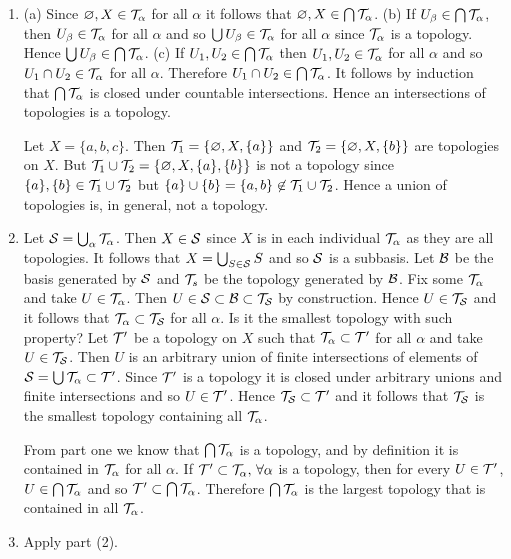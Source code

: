 \begin{sol}
    ${}$
    \begin{enumerate}
        \item (a) Since $\varnothing, X\in\mathcal{T}_\alpha$ for all $\alpha$ it follows that $\varnothing, X\in\bigcap\mathcal{T}_\alpha$. (b) If $U_\beta\in\bigcap\mathcal{T}_\alpha$, then $U_\beta\in\mathcal{T}_\alpha$ for all $\alpha$ and so $\bigcup U_\beta\in\mathcal{T}_\alpha$ for all $\alpha$ since $\mathcal{T}_\alpha$ is a topology. Hence $\bigcup U_\beta\in\bigcap\mathcal{T}_\alpha$. 
        (c) If $U_1,U_2\in\bigcap\mathcal{T}_\alpha$ then $U_1,U_2\in\mathcal{T}_\alpha$ for all $\alpha$ and so $U_1\cap U_2\in\mathcal{T}_\alpha$ for all $\alpha$. Therefore $U_1\cap U_2\in\bigcap \mathcal{T}_\alpha$. It follows by induction that $\bigcap\mathcal{T}_\alpha$ is closed under countable intersections. Hence an intersections of topologies is a topology.
        
        Let $X=\{a,b,c\}$. Then $\mathcal{T}_1=\{\varnothing, X, \{a\}\}$ and $\mathcal{T}_2=\{\varnothing, X, \{b\}\}$ are topologies on $X$. But $\mathcal{T}_1\cup\mathcal{T}_2=\{\varnothing, X, \{a\}, \{b\}\}$ is not a topology since $\{a\},\{b\}\in\mathcal{T}_1\cup\mathcal{T}_2$ but $\{a\}\cup\{b\}=\{a,b\}\not\in\mathcal{T}_1\cup\mathcal{T}_2$. Hence a union of topologies is, in general, not a topology. 
        
        \item Let $\mathcal{S}=\bigcup_\alpha \mathcal{T}_\alpha$. Then $X\in\mathcal{S}$ since $X$ is in each individual $\mathcal{T}_\alpha$ as they are all topologies. It follows that $X=\bigcup_{S\in\mathcal{S}} S$ and so $\mathcal{S}$ is a subbasis. 
        Let $\mathcal{B}$ be the basis generated by $\mathcal{S}$ and $\mathcal{T}_s$ be the topology generated by $\mathcal{B}$. Fix some $\mathcal{T}_\alpha$ and take $U\in\mathcal{T}_\alpha$. Then $U\in\mathcal{S}\subset\mathcal{B}\subset\mathcal{T}_{\mathcal{S}}$ by construction.
        Hence $U\in\mathcal{T}_{\mathcal{S}}$ and it follows that $\mathcal{T}_\alpha\subset\mathcal{T}_{\mathcal{S}}$ for all $\alpha$. Is it the smallest topology with such property? Let $\mathcal{T}'$ be a topology on $X$ such that $\mathcal{T}_\alpha\subset\mathcal{T}'$ for all $\alpha$ and take $U\in\mathcal{T}_{\mathcal{S}}$.
        Then $U$ is an arbitrary union of finite intersections of elements of $\mathcal{S}=\bigcup\mathcal{T}_\alpha\subset\mathcal{T}'$. Since $\mathcal{T}'$ is a topology it is closed under arbitrary unions and finite intersections and so $U\in\mathcal{T}'$. Hence $\mathcal{T}_{\mathcal{S}}\subset\mathcal{T}'$ and it follows that $\mathcal{T}_{\mathcal{S}}$ is the smallest topology containing all $\mathcal{T}_\alpha$.

        From part one we know that $\bigcap\mathcal{T}_\alpha$ is a topology, and by definition it is contained in $\mathcal{T}_\alpha$ for all $\alpha$. 
        If $\mathcal{T}'\subset\mathcal{T}_\alpha,\,\forall\alpha$ is a topology, then for every $U\in\mathcal{T}'$, $U\in\bigcap\mathcal{T}_\alpha$ and so $\mathcal{T}'\subset\bigcap\mathcal{T}_\alpha$. Therefore $\bigcap\mathcal{T}_\alpha$ is the largest topology that is contained in all $\mathcal{T}_\alpha$.
        
        \item Apply part (2).
    \end{enumerate}
\end{sol}


